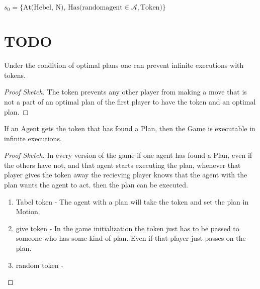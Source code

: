   $s_0=\{\text{At(Hebel, N), Has(randomagent} \in \mathcal{A},\text{Token)}\}$

\section{TODO}
\begin{theorem}
Under the condition of optimal plans one can prevent infinite executions with tokens.
\end{theorem}

\begin{proof}[Proof Sketch]
  The token prevents any other player from making a move that is not a part of an optimal plan of the first player to have the token and an optimal plan.
\end{proof}

\begin{theorem}
If an Agent gets the token that has found a Plan, then the Game is executable in infinite executions.
\end{theorem}

\begin{proof}[Proof Sketch]
In every version of the game if one agent has found a Plan, even if the others have not, and that agent starts executing the plan, whenever that player gives the token away the recieving player knows that the agent with the plan wants the agent to act. then the plan can be executed.
\begin{enumerate}
  \item Tabel token - The agent with a plan will take the token and set the plan in Motion.
  \item give token - In the game initialization the token just has to be passed to someone who has some kind of plan. Even if that player just passes on the plan.
  \item random token - 
\end{enumerate}
\end{proof}
